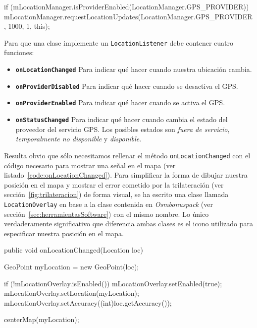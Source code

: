 \begin{listing}[
  float=ht,
  language = java,
  caption  = {Ejemplo de uso de \texttt{LocationManager} utilizando la propia clase como
                 \texttt{LocationListener} y 1 segundo de intervalo entre actualizaciones},
  label    = code:locationManager]
if (mLocationManager.isProviderEnabled(LocationManager.GPS_PROVIDER)) {
    mLocationManager.requestLocationUpdates(LocationManager.GPS_PROVIDER, 1000, 1, this);
}
\end{listing}

Para que una clase implemente un \texttt{LocationListener} debe contener cuatro funciones:

\begin{itemize}
  \item \textbf{\texttt{onLocationChanged}} Para indicar qué hacer cuando nuestra ubicación cambia.
  \item \textbf{\texttt{onProviderDisabled}} Para indicar qué hacer cuando se desactiva el
    \acs{GPS}.
  \item \textbf{\texttt{onProviderEnabled}} Para indicar qué hacer cuando se activa el \acs{GPS}.
  \item \textbf{\texttt{onStatusChanged}} Para indicar qué hacer cuando cambia el estado del
    proveedor del servicio \acs{GPS}. Los posibles estados son \emph{fuera de servicio},
    \emph{temporalmente no disponible} y \emph{disponible}.
\end{itemize}

Resulta obvio que sólo necesitamos rellenar el método \texttt{onLocationChanged} con el código
necesario para mostrar una señal en el mapa (ver listado~\ref{code:onLocationChanged}). Para
simplificar la forma de dibujar nuestra posición en el mapa y mostrar el error cometido por la
trilateración (ver sección~\ref{fig:trilateracion}) de forma visual, se ha escrito una clase llamada
\texttt{LocationOverlay} en base a la clase contenida en \emph{Osmbonuspack} (ver
sección~\ref{sec:herramientasSoftware}) con el mismo nombre. Lo único verdaderamente significativo
que diferencia ambas clases es el icono utilizado para especificar nuestra posición en el mapa.

\begin{listing}[
  float=ht,
  language = java,
  caption  = {Ejemplo de implementación de \texttt{LocationListener} utilizando para mostrar la
                localización un \texttt{LocationOverlay}},
  label    = code:onLocationChanged]
public void onLocationChanged(Location loc) {
    GeoPoint myLocation = new GeoPoint(loc); 	
    
    if (!mLocationOverlay.isEnabled()) {
        mLocationOverlay.setEnabled(true);
    }
    mLocationOverlay.setLocation(myLocation);
    mLocationOverlay.setAccuracy((int)loc.getAccuracy());

    centerMap(myLocation);
}
\end{listing}


